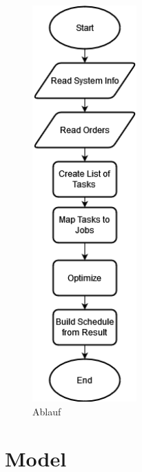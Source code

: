 \documentclass[a4paper,12pt,twoside]{scrreprt}
\begin{document}
\begin{flushleft}
	\begin{figure}[H]
		\centering
		\includegraphics[width=4cm]{images/ablauf}
		\caption{Ablauf}
		\label{fig:ablauf}
	\end{figure}
\end{flushleft}
\section{Model}
\end{document}
